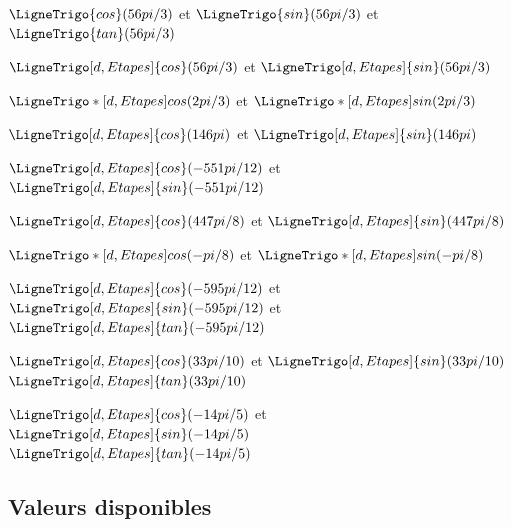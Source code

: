 \documentclass[a4paper,french,11pt]{article}
\begin{document}
\begin{PresCodePL}{}
$\LigneTrigo{cos}(56pi/3)$ et $\LigneTrigo{sin}(56pi/3)$ et $\LigneTrigo{tan}(56pi/3)$
\end{PresCodePL}

\begin{PresCodePL}{}
$\LigneTrigo[d,Etapes]{cos}(56pi/3)$ et $\LigneTrigo[d,Etapes]{sin}(56pi/3)$
\end{PresCodePL}

\begin{PresCodePL}{}
$\LigneTrigo*[d,Etapes]{cos}(2pi/3)$ et $\LigneTrigo*[d,Etapes]{sin}(2pi/3)$
\end{PresCodePL}

\begin{PresCodePL}{}
$\LigneTrigo[d,Etapes]{cos}(146pi)$ et $\LigneTrigo[d,Etapes]{sin}(146pi)$
\end{PresCodePL}

\begin{PresCodePL}{}
$\LigneTrigo[d,Etapes]{cos}(-551pi/12)$ et $\LigneTrigo[d,Etapes]{sin}(-551pi/12)$
\end{PresCodePL}

\begin{PresCodePL}{}
$\LigneTrigo[d,Etapes]{cos}(447pi/8)$ et $\LigneTrigo[d,Etapes]{sin}(447pi/8)$
\end{PresCodePL}

\begin{PresCodePL}{}
$\LigneTrigo*[d,Etapes]{cos}(-pi/8)$ et $\LigneTrigo*[d,Etapes]{sin}(-pi/8)$
\end{PresCodePL}

\begin{PresCodePL}{}
$\LigneTrigo[d,Etapes]{cos}(-595pi/12)$ et $\LigneTrigo[d,Etapes]{sin}(-595pi/12)$ et $\LigneTrigo[d,Etapes]{tan}(-595pi/12)$
\end{PresCodePL}

\begin{PresCodePL}{}
$\LigneTrigo[d,Etapes]{cos}(33pi/10)$ et $\LigneTrigo[d,Etapes]{sin}(33pi/10)$\\
$\LigneTrigo[d,Etapes]{tan}(33pi/10)$
\end{PresCodePL}

\begin{PresCodePL}{}
$\LigneTrigo[d,Etapes]{cos}(-14pi/5)$ et $\LigneTrigo[d,Etapes]{sin}(-14pi/5)$\\
$\LigneTrigo[d,Etapes]{tan}(-14pi/5)$
\end{PresCodePL}

\subsection{Valeurs disponibles}
\end{document}
